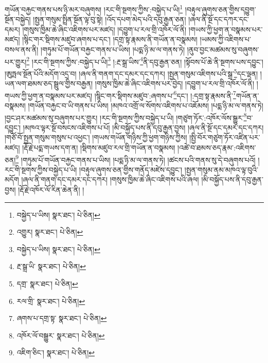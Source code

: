 གཡོན་བརྐྱང་གནས་པས་ཉི་མར་བཞུགས། །རང་གི་སྔགས་ཀྱིས་:བསྐྱེད་པ་ཡི།\footnote{བསྐྱེད་པ་ཡིས།  སྣར་ཐང་།  པེ་ཅིན། } །བརྟུལ་ཞུགས་ཅན་གྱིས་དབྱུག་སྔོན་བསྐྱེད། །སྤྱན་གསུམ་སྤྲིན་སྔོན་ལྟ་བུ་སྟེ། །འོད་དཔག་མེད་པའི་དབུ་རྒྱན་ཅན། །ཞལ་ནི་སྔོ་དང་དཀར་དང་དམར། །གསུས་ཁྱིམ་ཆེ་ཞིང་འཇིགས་པར་མཛད། །དབྱུག་པ་རལ་གྲི་འཁོར་ལོ་ནི། །གཡས་ཀྱི་ཕྱག་ན་བསྣམས་པར་མཛད། །སྙིང་གར་སྡིགས་མཛུབ་ཞགས་པ་དང་། །དགྲ་སྟ་རྣམས་ནི་གཡོན་ན་བསྣམས། །ཡམས་ཀྱི་འཇིགས་པ་བསལ་ནས་ནི། །གཏུམ་པོ་གཡོན་བརྐྱང་གནས་པ་ཡིས། །པདྨ་ཉི་མ་ལ་གནས་ཏེ། །ནུབ་བྱང་མཚམས་སུ་བཞུགས་པར་གྱུར།\footnote{འགྱུར།  སྣར་ཐང་།  པེ་ཅིན། } །རང་གི་སྔགས་ཀྱིས་:བསྐྱེད་པ་ཡི།\footnote{བསྐྱེད་པ་ཡིས།  སྣར་ཐང་།  པེ་ཅིན། } །:རྔ་སྒྲ་ཡིས་\footnote{རྔ་སྒྲ་ཡི་  སྣར་ཐང་།  པེ་ཅིན། }ནི་དབུ་རྒྱན་ཅན། །སྟོབས་པོ་ཆེ་ནི་སྔགས་པས་དབྱུང་། །ཨུཏྤལ་སྔོན་པོའི་མདོག་འདྲ་བ། །ཞལ་ནི་གནག་དང་དམར་དང་དཀར། །སྤྱན་གསུམ་འཇིགས་པའི་སྒྲ་\footnote{དགྲ་  སྣར་ཐང་།  པེ་ཅིན། }དང་ལྡན། །ཡན་ལག་ཐམས་ཅད་སྦྲུལ་གྱིས་བརྒྱན། །གསུས་ཁྱིམ་ཆེ་ཞིང་འཇིགས་པར་བྱེད། །དབྱུག་པ་རལ་གྲི་འཁོར་ལོ་ནི། །གཡས་ཀྱི་ཕྱག་ན་བསྣམས་པར་མཛད། །སྙིང་གར་སྡིགས་མཛུབ་:ཞགས་པ་\footnote{རལ་གྲི་  སྣར་ཐང་།  པེ་ཅིན། }དང་། །:དགྲ་སྟ་རྣམས་ནི་\footnote{ཞགས་པ་དགྲ་སྟ་  སྣར་ཐང་།  པེ་ཅིན། }གཡོན་ན་བསྣམས། །གཡོན་བརྐྱང་བ་ཡི་གནས་པ་ཡིས། །མཁའ་འགྲོ་ལ་སོགས་འཇིགས་པ་འཇོམས། །པདྨ་ཉི་མ་ལ་གནས་ཏེ། །བྱང་ཤར་མཚམས་སུ་བཞུགས་པར་གྱུར། །རང་གི་སྔགས་ཀྱིས་བསྐྱེད་པ་ཡི། །གཙུག་ཏོར་:འཁོར་ལོས་སྒྱུར་\footnote{འཁོར་ལོ་བསྒྱུར་  སྣར་ཐང་།  པེ་ཅིན། }བ་དབྱུང་། །མཁའ་ལྟར་སྔོ་བསངས་འཇིགས་པ་པོ། །མི་བསྐྱོད་པས་ནི་དབུ་རྒྱན་བྱས། །ཞལ་ནི་སྔོ་དང་དམར་དང་དཀར། །གཙོ་བོ་སྤྱན་གསུམ་གསུས་པ་འཕྱང་། །གཡས་གཡོན་གཉིས་ཀྱི་ཕྱག་གཉིས་ཀྱིས། །སྤྱི་བོར་གཙུག་ཏོར་འཛིན་པར་མཛད། །རྡོ་རྗེ་པདྨ་གཡས་དག་ན། །སྡིགས་མཛུབ་རལ་གྲི་གཡོན་ན་བསྣམས། །འཚེ་བ་ཐམས་ཅད་རྣམ་:འཇིགས་ཅན།\footnote{འཇིག་ཅིང་།  སྣར་ཐང་།  པེ་ཅིན། } །གཏུམ་པོ་གཡོན་བརྐྱང་གནས་པ་ཡིས། །པདྨ་ཉི་མ་ལ་གནས་ཏེ། །ཚངས་པའི་གནས་སུ་དེ་བཞུགས་པའོ། །རང་གི་སྔགས་ཀྱིས་བསྐྱེད་པ་ཡི། །བརྟུལ་ཞུགས་ཅན་གྱིས་གནོད་མཛེས་དབྱུང་། །སྤྱན་གསུམ་ནམ་མཁའ་ལྟ་བུའི་མདོག །ཞལ་ནི་གནག་དང་དམར་དང་དཀར། །གསུས་ཁྱིམ་ཆེ་ཞིང་འཇིགས་པའི་ཞལ། །མི་བསྐྱོད་པས་ནི་དབུ་རྒྱན་བྱས། །རྡོ་རྗེ་འཁོར་ལོ་རིན་ཆེན་ནི། །
